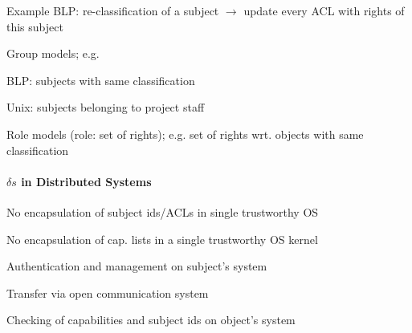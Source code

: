 \documentclass[a4paper]{article}
\begin{document}
\begin{multicols}{3}
    Example BLP: re-classification of a subject $\rightarrow$ update every ACL with rights of this subject

    Group models; e.g.
    \begin{itemize*}
        \item BLP: subjects with same classification
        \item Unix: subjects belonging to project staff
    \end{itemize*}

    Role models (role: set of rights); e.g. set of rights wrt. objects with same classification

    \paragraph{$\delta s$ in Distributed Systems}
    \begin{itemize*}
        \item No encapsulation of subject ids/ACLs in single trustworthy OS
        \item No encapsulation of cap. lists in a single trustworthy OS kernel
        \begin{itemize*}
            \item Authentication and management on subject’s system
            \item Transfer via open communication system
            \item Checking of capabilities and subject ids on object’s system
        \end{itemize*}
    \end{itemize*}


\end{multicols}
\end{document}
